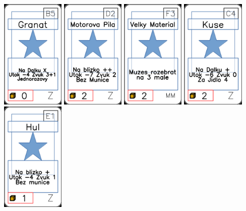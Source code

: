 \documentclass[a4paper]{article}
\begin{document}
	\includegraphics[width=3.0cm]{img-1_99}
	\includegraphics[width=3.0cm]{img-1_106}
	\includegraphics[width=3.0cm]{img-1_57}
	\includegraphics[width=3.0cm]{img-1_103}
	\includegraphics[width=3.0cm]{img-1_80}
\end{document}
